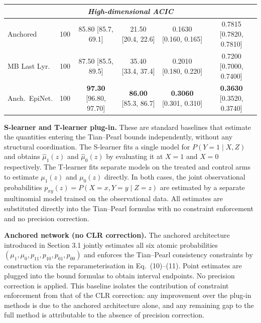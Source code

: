 \documentclass[accepted]{uai2026} %
\theoremstyle{plain}
\theoremstyle{definition}
\theoremstyle{remark}
\begin{document}
\begin{table}[htbp]
\begin{center}
\begin{small}
\begin{sc}
\begin{tabular}{lccccc}
    \midrule
    \multicolumn{6}{c}{\textit{High-dimensional ACIC}} \\
    \midrule
    Anchored       & 100                            & 85.80 {\tiny [85.7, 69.1] }      & 21.50 {\tiny [20.4, 22.6] }   & 0.1630 {\tiny [0.160, 0.165] }   & 0.7815 {\tiny [0.7820, 0.7810] } \\
    MB Last Lyr.   & 100                            & 87.50 {\tiny [85.5, 89.5] }      & 35.40 {\tiny [33.4, 37.4] }   & 0.2010 {\tiny [0.180, 0.220] }   & 0.7200 {\tiny [0.7000, 0.7400] } \\
    Anch.\ EpiNet. & 100                            & \textbf{97.30} {\tiny [96.80, 97.70] } & \textbf{86.00} {\tiny [85.3, 86.7] }   & \textbf{0.3060} {\tiny [0.301, 0.310] }   & \textbf{0.3630} {\tiny [0.3520, 0.3740] } \\
    \bottomrule
    \end{tabular}
\end{sc}
\end{small}
\end{center}
\vskip -0.1in
\end{table}


\textbf{S-learner and T-learner plug-in.} These are standard baselines that estimate the quantities entering the Tian--Pearl bounds independently, without any structural coordination. The S-learner fits a single model for $P(Y=1 \mid X, Z)$ and obtains $\hat{\mu}_1(z)$ and $\hat{\mu}_0(z)$ by evaluating it at $X=1$ and $X=0$ respectively. The T-learner fits separate models on the treated and control arms to estimate $\mu_1(z)$ and $\mu_0(z)$ directly. In both cases, the joint observational probabilities $p_{xy}(z) = P(X=x, Y=y \mid Z=z)$ are estimated by a separate multinomial model trained on the observational data. All estimates are substituted directly into the Tian--Pearl formulas with no constraint enforcement and no precision correction.

\textbf{Anchored network (no CLR correction).} The anchored architecture introduced in Section 3.1 jointly estimates all six atomic probabilities $(\mu_1, \mu_0, p_{11}, p_{10}, p_{01}, p_{00})$ and enforces the Tian--Pearl consistency constraints by construction via the reparameterisation in Eq.~(10)--(11). Point estimates are plugged into the bound formulas to obtain interval endpoints. No precision correction is applied. This baseline isolates the contribution of constraint enforcement from that of the CLR correction: any improvement over the plug-in methods is due to the anchored architecture alone, and any remaining gap to the full method is attributable to the absence of precision correction.
\end{document}
